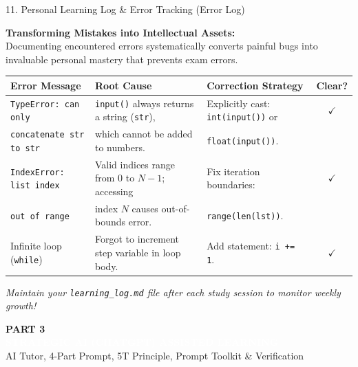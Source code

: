 \documentclass[aspectratio=169, 10pt]{beamer}
\begin{document}
\begin{frame}{11. Personal Learning Log \& Error Tracking (Error Log)}
  \begin{tcolorbox}[colback=secondarygreen!8, colframe=secondarygreen, arc=3pt, left=8pt, right=8pt, top=3pt, bottom=3pt]
    \textbf{\footnotesize Transforming Mistakes into Intellectual Assets:} \\
    \footnotesize Documenting encountered errors systematically converts painful bugs into invaluable personal mastery that prevents exam errors.
  \end{tcolorbox}
  \vspace{0.1cm}
  \scriptsize
  \begin{tabularx}{\textwidth}{l X X c}
    \toprule
    \textbf{Error Message} & \textbf{Root Cause} & \textbf{Correction Strategy} & \textbf{Clear?} \\
    \midrule
    \texttt{TypeError: can only} & \texttt{input()} always returns a string (\texttt{str}), & Explicitly cast: \texttt{int(input())} or & $\checkmark$ \\
    \texttt{concatenate str to str} & which cannot be added to numbers. & \texttt{float(input())}. & \\
    \midrule
    \texttt{IndexError: list index} & Valid indices range from $0$ to $N-1$; accessing & Fix iteration boundaries: & $\checkmark$ \\
    \texttt{out of range} & index $N$ causes out-of-bounds error. & \texttt{range(len(lst))}. & \\
    \midrule
    Infinite loop (\texttt{while}) & Forgot to increment step variable in loop body. & Add statement: \texttt{i += 1}. & $\checkmark$ \\
    \bottomrule
  \end{tabularx}
  \vspace{0.15cm}
  \centering\footnotesize\itshape
  Maintain your \texttt{learning\_log.md} file after each study session to monitor weekly growth!
\end{frame}

\begin{frame}[plain]
  \vfill
  \begin{tcolorbox}[colback=accentorange, colframe=accentorange, arc=5pt, left=15pt, right=15pt, top=15pt, bottom=15pt]
    \textcolor{primaryblue}{\large\textbf{PART 3}}\\[4pt]
    {\LARGE\textbf{\textcolor{white}{STRATEGIC AI (CHATGPT) ASSISTED LEARNING}}}\\[6pt]
    \textcolor{white!90}{\small AI Tutor, 4-Part Prompt, 5T Principle, Prompt Toolkit \& Verification}
  \end{tcolorbox}
  \vfill
\end{frame}
\end{document}
